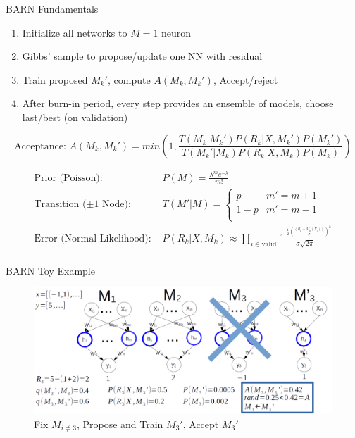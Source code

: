 \documentclass{beamer}
\begin{document}
\begin{frame}
\begin{columns}
\begin{column}{.33\textwidth}
\begin{minipage}{.98\textwidth}
{\begin{myblock}{BARN Fundamentals}
\begin{enumerate}
\item Initialize all networks to $M=1$ neuron
\item Gibbs' sample to propose/update one NN with residual
\item Train proposed $M_k'$, compute $A(M_k,M_k')$, Accept/reject
\item After burn-in period, every step provides an ensemble of models, choose last/best (on validation)
\end{enumerate}

$$
\text{Acceptance: } A(M_k,M_k') = min(1, \frac{T(M_k|M_k') P(R_k|X,M_k')P(M_k')}{T(M_k'|M_k) P(R_k|X,M_k)P(M_k)})
$$

$$
\begin{aligned}
\text{Prior (Poisson): } & P(M) = \frac{\lambda^m e^{-\lambda}}{m!} \\
\text{Transition ($\pm1$ Node): } & T(M'|M) = \begin{cases}
			p & m' = m + 1 \\
			1-p & m' = m - 1 \\
\end{cases} \\
\text{Error (Normal Likelihood): } & P(R_k|X,M_k) \approx \prod_{i \in \text{valid}} \frac{e^{-\frac{1}{2}\left(\frac{(R_k-M_k(X_i))}{\sigma}\right)^2}}{\sigma \sqrt{2\pi}} \\
\end{aligned}
$$
			\end{myblock}
			\begin{myblock}{BARN Toy Example}
\begin{figure}[h]
\includegraphics[scale=0.75]{barn_ex3.png}
\caption{Fix $M_{i\neq 3}$, Propose and Train $M_3'$, Accept $M_3'$}
\end{figure}
			\end{myblock}
	}
	\end{minipage}

\end{column}
\end{columns}
\end{frame}
\end{document}
